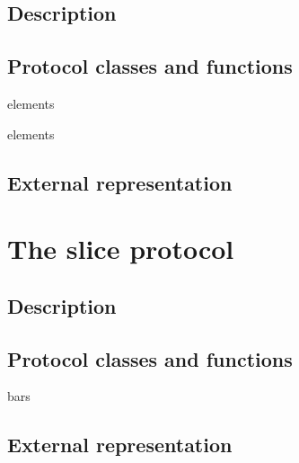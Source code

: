 \subsection{Description}


\subsection{Protocol classes and functions}



 {\key elements}


 {\key elements}

\subsection{External representation}


\section{The slice protocol}

\subsection{Description}


\subsection{Protocol classes and functions}


 {\key bars}

\subsection{External representation}


